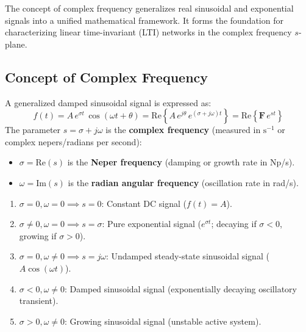 \documentclass[12pt,a4paper]{article}
\begin{document}
The concept of complex frequency generalizes real sinusoidal and exponential signals into a unified mathematical framework. It forms the foundation for characterizing linear time-invariant (LTI) networks in the complex frequency $s$-plane.

\subsection{Concept of Complex Frequency}

\begin{tcolorbox}[defbox, title={\textbf{Definition of Complex Frequency}}]
A generalized damped sinusoidal signal is expressed as:
\begin{equation}
  f(t) = A\,e^{\sigma t}\,\cos(\omega t + \theta) = \text{Re}\left\{ A\,e^{j\theta}\,e^{(\sigma + j\omega)t} \right\} = \text{Re}\left\{ \mathbf{F}\,e^{st} \right\}
\end{equation}
The parameter $s = \sigma + j\omega$ is the \textbf{complex frequency} (measured in $\text{s}^{-1}$ or complex nepers/radians per second):
\begin{itemize}[leftmargin=*]
  \item $\sigma = \text{Re}(s)$ is the \textbf{Neper frequency} (damping or growth rate in Np/s).
  \item $\omega = \text{Im}(s)$ is the \textbf{radian angular frequency} (oscillation rate in rad/s).
\end{itemize}
\end{tcolorbox}

\begin{tcolorbox}[formulabox, title={\textbf{Special Cases of the Complex Frequency Variable $s = \sigma + j\omega$}}]
\begin{enumerate}[leftmargin=*]
  \item $\sigma = 0, \omega = 0 \implies s = 0$: Constant DC signal ($f(t) = A$).
  \item $\sigma \ne 0, \omega = 0 \implies s = \sigma$: Pure exponential signal ($e^{\sigma t}$; decaying if $\sigma < 0$, growing if $\sigma > 0$).
  \item $\sigma = 0, \omega \ne 0 \implies s = j\omega$: Undamped steady-state sinusoidal signal ($A\cos(\omega t)$).
  \item $\sigma < 0, \omega \ne 0$: Damped sinusoidal signal (exponentially decaying oscillatory transient).
  \item $\sigma > 0, \omega \ne 0$: Growing sinusoidal signal (unstable active system).
\end{enumerate}
\end{tcolorbox}
\end{document}
